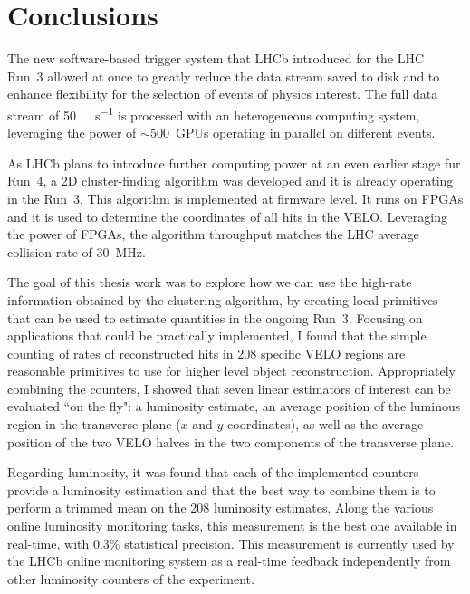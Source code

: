 
\chapter{Conclusions}
\label{chp:conclusion}
The new software-based trigger system that LHCb introduced for the LHC Run~3 allowed at once to greatly reduce the data stream saved to disk and to enhance flexibility for the selection of events of physics interest. The full data stream of \SI{50}{\tera\bit\per\second} is processed with an heterogeneous computing system, leveraging the power of $\sim 500$~GPUs operating in parallel on different events.

As LHCb plans to introduce further computing power at an even earlier stage fur Run~4, a 2D cluster-finding algorithm was developed and it is already operating in the Run~3. This algorithm is implemented at firmware level. It runs on FPGAs and it is used to determine the coordinates of all hits in the VELO. Leveraging the power of FPGAs, the algorithm throughput matches the LHC average collision rate of \SI{30}{\mega\hertz}.

The goal of this thesis work was to explore how we can use the high-rate information obtained by the clustering algorithm, by creating local primitives that can be used to estimate quantities in the ongoing Run~3.
Focusing on applications that could be practically implemented, I found that the simple counting of rates of reconstructed hits in 208 specific VELO regions are reasonable primitives to use for higher level object reconstruction. Appropriately combining the counters, I showed that seven linear estimators of interest can be evaluated ``on the fly": a luminosity estimate, an average position of the luminous region in the transverse plane ($x$ and $y$ coordinates), as well as the average position of the two VELO halves in the two components of the transverse plane.

Regarding luminosity, it was found that each of the implemented counters provide a luminosity estimation and that the best way to combine them is to perform a trimmed mean on the 208 luminosity estimates. Along the various online luminosity monitoring tasks, this measurement is the best one available in real-time, with 0.3\% statistical precision. This measurement is currently used by the LHCb online monitoring system as a real-time feedback independently from other luminosity counters of the experiment.

